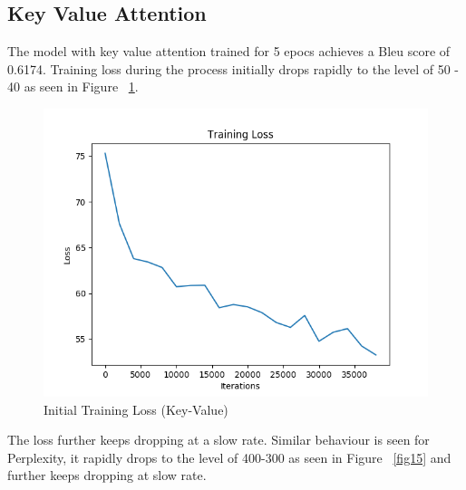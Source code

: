 \documentclass[11pt,a4paper]{article}
\begin{document}


\subsection{Key Value Attention}

The model with key value attention trained for 5 epocs achieves a Bleu score of 0.6174.
Training loss during the process initially drops rapidly to the level of 50 - 40 as seen in Figure ~\ref{fig13}. 

\begin{figure}[!htbp]
\includegraphics[width=\linewidth]{hi_key-value_loss_1.png}
\caption{Initial Training Loss (Key-Value)}
\label{fig13}
\end{figure}


The loss further keeps dropping at a slow rate. Similar behaviour is seen for Perplexity, it rapidly drops to the level of 400-300 as seen in Figure ~\ref{fig15} and further keeps dropping at slow rate.

\end{document}
